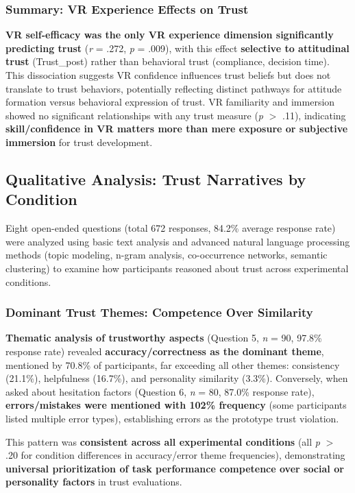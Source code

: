 \documentclass[12pt]{article}
\begin{document}
\subsubsection{Summary: VR Experience Effects on Trust}

\textbf{VR self-efficacy was the only VR experience dimension significantly predicting trust} (\textit{r} = .272, \textit{p} = .009), with this effect \textbf{selective to attitudinal trust} (Trust\_post) rather than behavioral trust (compliance, decision time). This dissociation suggests VR confidence influences trust beliefs but does not translate to trust behaviors, potentially reflecting distinct pathways for attitude formation versus behavioral expression of trust. VR familiarity and immersion showed no significant relationships with any trust measure (\textit{p} $>$ .11), indicating \textbf{skill/confidence in VR matters more than mere exposure or subjective immersion} for trust development.

\subsection{Qualitative Analysis: Trust Narratives by Condition}

Eight open-ended questions (total 672 responses, 84.2\% average response rate) were analyzed using basic text analysis and advanced natural language processing methods (topic modeling, n-gram analysis, co-occurrence networks, semantic clustering) to examine how participants reasoned about trust across experimental conditions.

\subsubsection{Dominant Trust Themes: Competence Over Similarity}

\textbf{Thematic analysis of trustworthy aspects} (Question 5, \textit{n} = 90, 97.8\% response rate) revealed \textbf{accuracy/correctness as the dominant theme}, mentioned by 70.8\% of participants, far exceeding all other themes: consistency (21.1\%), helpfulness (16.7\%), and personality similarity (3.3\%). Conversely, when asked about hesitation factors (Question 6, \textit{n} = 80, 87.0\% response rate), \textbf{errors/mistakes were mentioned with 102\% frequency} (some participants listed multiple error types), establishing errors as the prototype trust violation.

This pattern was \textbf{consistent across all experimental conditions} (all \textit{p} $>$ .20 for condition differences in accuracy/error theme frequencies), demonstrating \textbf{universal prioritization of task performance competence over social or personality factors} in trust evaluations.
\end{document}

